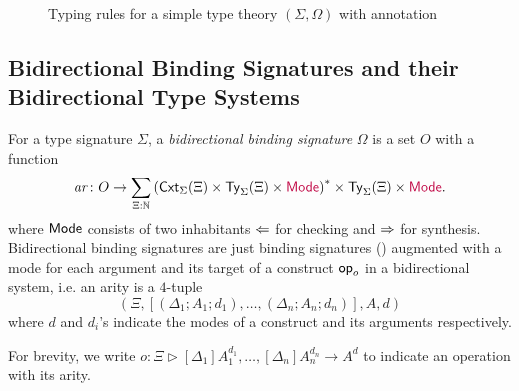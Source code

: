 \begin{figure}
  \centering
  \small
  \caption{Typing rules for a simple type theory $(\Sigma, \Omega)$ with annotation}
  \label{fig:extrinsic-typing}
\end{figure}

\subsection{Bidirectional Binding Signatures and their Bidirectional Type Systems}

\begin{definition}
  For a type signature $\Sigma$, a \emph{bidirectional binding signature} $\Omega$ is a set $O$ with a function
  \[
    \mathit{ar}\colon O \to \sum_{\Xi : \mathbb{N}} \left(\mathsf{Cxt}_{\Sigma}(\Xi) \times \mathsf{Ty}_{\Sigma}(\Xi) \times {\mathrel{\textcolor{purple}{\mathsf{Mode}}}}\right)^* \times \mathsf{Ty}_{\Sigma}(\Xi) \times {\mathrel{\textcolor{purple}{\mathsf{Mode}}}}.
  \]
  where $\mathsf{Mode}$ consists of two inhabitants $\Leftarrow$ for checking and $\Rightarrow$ for synthesis.
  Bidirectional binding signatures are just binding signatures () augmented with a mode for each argument and its target of a construct $\mathsf{op}_o$ in a bidirectional system, i.e.
  an arity is a $4$-tuple
  \[
    \left(\Xi, \left[\left(\Delta_1; A_1; d_1\right), \ldots, \left(\Delta_{n}; A_{n}; d_n\right) \right], A, d\right)
  \]
  where $d$ and $d_i$'s indicate the modes of a construct and its arguments respectively.

  For brevity, we write $o \colon \Xi \rhd [\Delta_1]A_{1}^{d_1}, \ldots, [\Delta_{n}] A^{d_n}_{n} \to A^{d}$ to indicate an operation with its arity. 
\end{definition}

